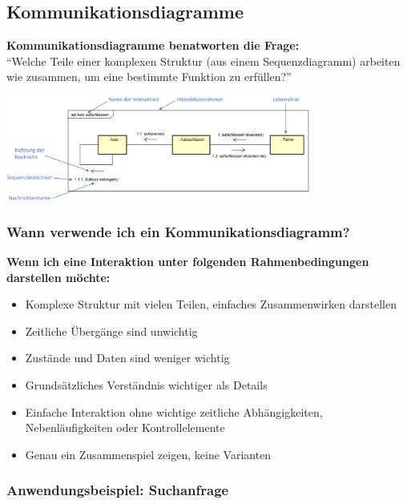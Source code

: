 \documentclass[11pt, a4paper]{article}
\begin{document}
\newpage



\raggedright \subsection{Kommunikationsdiagramme}

\textbf{Kommunikationsdiagramme benatworten die Frage:} \\ “Welche Teile einer komplexen Struktur (aus einem Sequenzdiagramm) arbeiten wie zusammen, um eine bestimmte Funktion zu erfüllen?”

\vspace{1em}

\centering \includegraphics[width=0.75\textwidth]{Kommunikation-00.png}

\vspace{1em}

\raggedright \subsubsection*{Wann verwende ich ein Kommunikationsdiagramm?}

\textbf{Wenn ich eine Interaktion unter folgenden Rahmenbedingungen darstellen möchte:}

\small
\begin{itemize}
    \item Komplexe Struktur mit vielen Teilen, einfaches Zusammenwirken darstellen
    \item Zeitliche Übergänge sind unwichtig
    \item Zustände und Daten sind weniger wichtig
    \item Grundsätzliches Verständnis wichtiger als Details
    \item Einfache Interaktion ohne wichtige zeitliche Abhängigkeiten, Nebenläufigkeiten oder Kontrollelemente
    \item Genau ein Zusammenspiel zeigen, keine Varianten
\end{itemize}

\vspace{1em}

\raggedright \subsubsection*{Anwendungsbeispiel: Suchanfrage}
\end{document}
